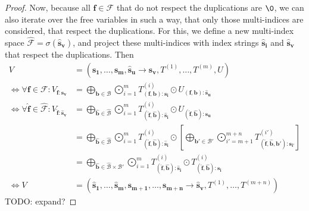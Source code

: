 \begin{proof}
    Now, because all $\bm{f} \in \mathcal{F}$ that do not respect the duplications are $\0$, we can also iterate over the free variables in such a way, that only those multi-indices are considered, that respect the duplications.
    For this, we define a new multi-index space $\mathcal{\hat{F}} = \sigma(\bm{\hat{s}_v})$,
    and project these multi-indices with index strings $\bm{\hat{s}_i}$ and $\bm{\hat{s}_v}$ that respect the duplications. Then
    \begin{align*}
        V                                                                                 & = (\bm{s_1},\dots,\bm{s_m}, \bm{\hat{s}_u} \rightarrow \bm{s_v}, T^{(1)},\dots,T^{(m)}, U)                                                                                                                                                                                                                 \\
        \iff \forall \bm{f} \in \mathcal{F}: V_{\bm{f}: \bm{s_v}}                         & = \bigoplus\limits_{\bm{b} \in \mathcal{B}} \bigodot\limits_{i = 1}^{m} T^{(i)}_{(\bm{f}, \bm{b}):\bm{s_i}} \odot U_{(\bm{f}, \bm{b}):\bm{\hat{s}_u}}                                                                                                                                                      \\
        \iff \forall \bm{\hat{f}} \in \mathcal{\hat{F}}: V_{\bm{\hat{f}}: \bm{\hat{s}_v}} & = \bigoplus\limits_{\bm{\hat{b}} \in \mathcal{\hat{B}}} \bigodot\limits_{i = 1}^{m} T^{(i)}_{(\bm{\hat{f}}, \bm{\hat{b}}):\bm{\hat{s}_i}} \odot U_{(\bm{\hat{f}}, \bm{\hat{b}}):\bm{s_u}}                                                                                                                  \\
                                                                                          & = \bigoplus\limits_{\bm{\hat{b}} \in \mathcal{\hat{B}}} \bigodot\limits_{i = 1}^{m} T^{(i)}_{(\bm{\hat{f}}, \bm{\hat{b}}):\bm{\hat{s}_i}} \odot \left[\bigoplus\limits_{\bm{b'} \in \mathcal{B}'} \bigodot\limits_{i' = m + 1}^{m + n} T^{(i')}_{(\bm{\hat{f}}, \bm{\hat{b}}, \bm{b'}):\bm{s_{i'}}}\right] \\
                                                                                          & = \bigoplus\limits_{\bm{\hat{b}} \in \mathcal{\hat{B}} \times \mathcal{B}'} \bigodot\limits_{i = 1}^{m} T^{(i)}_{(\bm{\hat{f}}, \bm{\hat{b}}):\bm{\hat{s}_i}} \odot T^{(i)}_{(\bm{\hat{f}}, \bm{\hat{b}}):\bm{s_i}}                                                                                        \\
        \iff V                                                                            & = (\bm{\hat{s}_1}, \dots, \bm{\hat{s}_m}, \bm{s_{m + 1}}, \dots, \bm{s_{m + n}} \rightarrow \bm{\hat{s}_v}, T^{(1)}, \dots, T^{(m + n)})
    \end{align*}
    TODO: expand?
\end{proof}
\bigskip